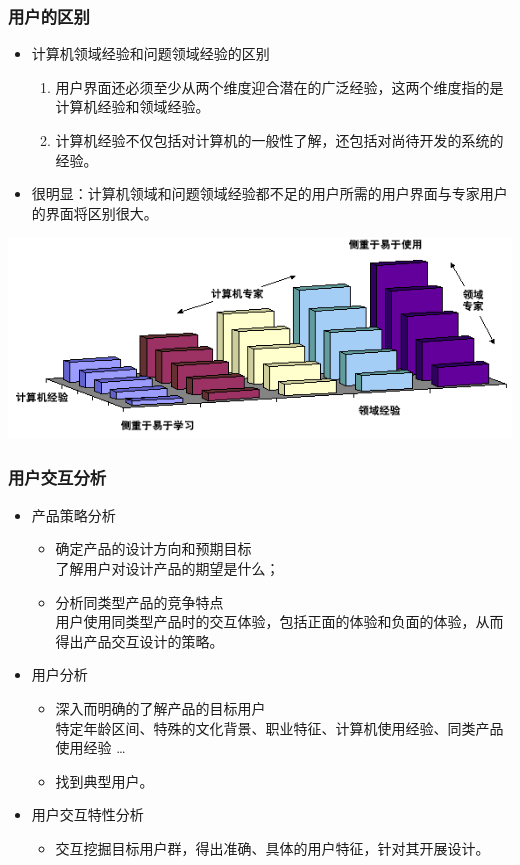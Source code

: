 \documentclass{beamer}
\begin{document}
\begin{frame}
	\frametitle{用户的区别}
	\beamertemplatetransparentcovereddynamicmedium
	\begin{itemize}[<+->]
		\item 计算机领域经验和问题领域经验的区别
		\begin{enumerate}
			\item 用户界面还必须至少从两个维度迎合潜在的广泛经验，这两个维度指的是计算机经验和领域经验。
			\item 计算机经验不仅包括对计算机的一般性了解，还包括对尚待开发的系统的经验。
		\end{enumerate}
		\item 很明显：计算机领域和问题领域经验都不足的用户所需的用户界面与专家用户的界面将区别很大。
	\end{itemize}
	\begin{center}
	\includegraphics[width=.7\textwidth]{images/user-experts.png}
	\end{center}
\end{frame}

\begin{frame}
	\frametitle{用户交互分析}
	\beamertemplatetransparentcovereddynamicmedium
	\begin{itemize}
		\item 产品策略分析
		\begin{itemize}
			\item 确定产品的设计方向和预期目标\\{\tiny 了解用户对设计产品的期望是什么；}
			\item 分析同类型产品的竞争特点\\{\tiny 用户使用同类型产品时的交互体验，包括正面的体验和负面的体验，从而得出产品交互设计的策略。}
		\end{itemize}
		\pause
		\item 用户分析
		\begin{itemize}
			\item 深入而明确的了解产品的目标用户\\{\tiny 特定年龄区间、特殊的文化背景、职业特征、计算机使用经验、同类产品使用经验 \dots}
			\item 找到典型用户。
		\end{itemize}
		\pause
		\item 用户交互特性分析
		\begin{itemize}
			\item 交互挖掘目标用户群，得出准确、具体的用户特征，针对其开展设计。
		\end{itemize}
	\end{itemize}
\end{frame}
\end{document}
